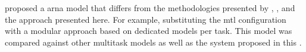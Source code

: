 
\textcite{mcleod2021modular} proposed a \gls{arna} model
that differs from the methodologies presented by
\textcite{chen2021attend}, \textcite{micchi2021deep}, and
the approach presented here. For example, substituting the
\gls{mtl} configuration with a modular approach based on
dedicated models per task. This model was compared against
other multitask models as well as the system proposed in
this \thesisdiss{}.
